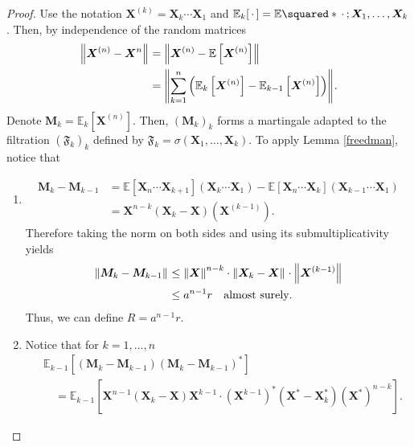 \begin{proof}
  Use the notation \( \bm{X}^{(k)} = \bm{X}_k \cdots \bm{X}_1 \) and \( \mathbb{E}_k[\,\cdot\,] = \mathbb{E}\squared*{\,\cdot\,;\bm{X}_1,\dots,\bm{X}_k} \). Then, by independence of the random matrices
  \begin{align*}
    \norm{\bm{X}^{(n)}-\bm{X}^{n}}_{} & = \norm{ \bm{X}^{(n)}- \mathbb{E}\left[\bm{X}^{(n)}\right]} \\
                                      &= \norm{\sum_{k=1}^{n} \left(\mathbb{E}_k\left[\bm{X}^{(n)}\right]- \mathbb{E}_{k-1}\left[\bm{X}^{(n)}\right]\right)}_{}. 
  \end{align*}
  Denote \( \bm{M}_k =\mathbb{E}_k[\bm{X}^{(n)}] \). Then, \( \left(\bm{M}_k\right)_k \) forms a martingale adapted to the filtration \( \left(\mathfrak{F}_k\right)_k \) defined by \( \mathfrak{F}_k= \sigma(\bm{X}_1, \dots, \bm{X}_k) \). To apply Lemma \ref{freedman}, notice that 
  \begin{enumerate}[1)]
    \item 
      \begin{align*}
        \bm{M}_k-\bm{M}_{k-1} &= \mathbb{E}\left[\bm{X}_n \cdots \bm{X}_{k+1}\right] \left(\bm{X}_k \cdots \bm{X}_1\right) - \mathbb{E}\left[\bm{X}_n \cdots \bm{X}_k\right]  \left(\bm{X}_{k-1} \cdots \bm{X}_1\right)  \\
                              &=\bm{X}^{n-k} \left(\bm{X}_k-\bm{X}\right) \left(\bm{X}^{(k-1)}\right).
      \end{align*}
     Therefore taking the norm on both sides and using its submultiplicativity yields 
     \begin{align*}
       \norm{\bm{M}_k-\bm{M}_{k-1}}_{} & \leq \norm{\bm{X}}_{}^{n-k} \cdot \norm{ \bm{X}_k-\bm{X}}_{} \cdot \norm{\bm{X}^{(k-1)}}_{} \\
                                       & \leq a^{n-1}r \quad \text{almost surely}.
     \end{align*}
     Thus, we can define \( R= a^{n-1}r \).
   \item Notice that for \( k=1, \dots, n \)
     \begin{align*}
      & \mathbb{E}_{k-1} \left[\left(\bm{M}_k-\bm{M}_{k-1}\right)\left(\bm{M}_k-\bm{M}_{k-1}\right)^{*}\right] \\
      & \quad= \mathbb{E}_{k-1}\left[\bm{X}^{n-1} \left(\bm{X}_k-\bm{X}\right)\bm{X}^{k-1} \cdot \left(\bm{X}^{k-1}\right)^{*} \left(\bm{X}^{*}-\bm{X}_k^{*}\right) (\bm{X}^{*})^{n-k}\right].
     \end{align*}

\end{enumerate}
\end{proof}
